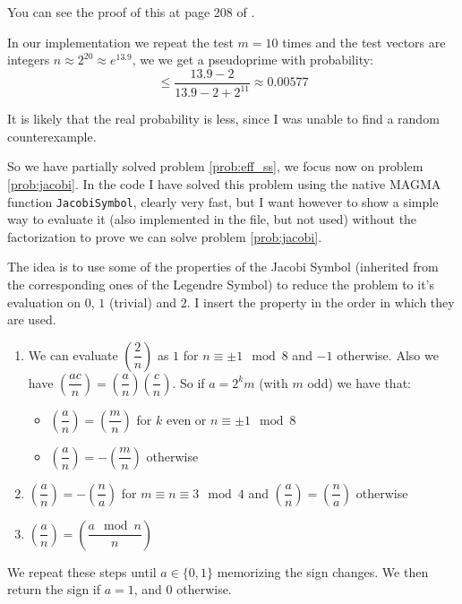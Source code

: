 \documentclass{article}
\theoremstyle{plain}
\theoremstyle{remark}
\theoremstyle{definition}
\begin{document}
You can see the proof of this at page 208 of \cite[Section 6.4.2]{stinson}.

In our implementation we repeat the test $m=10$ times and the test vectors are integers $n \approx 2^20 \approx e^{13.9}$, we we get a pseudoprime with probability:
\begin{equation*}
	\leq \frac{13.9 - 2}{13.9 - 2 + 2^{11}} \approx 0.00577
\end{equation*}

It is likely that the real probability is less, since I was unable to find a random counterexample.

So we have partially solved problem \ref{prob:eff_ss}, we focus now on problem \ref{prob:jacobi}. In the code I have solved this problem using the native MAGMA function \texttt{JacobiSymbol}, clearly very fast, but I want however to show a simple way to evaluate it (also implemented in the file, but not used) without the factorization to prove we can solve problem \ref{prob:jacobi}.

The idea is to use some of the properties of the Jacobi Symbol (inherited from the corresponding ones of the Legendre Symbol) to reduce the problem to it's evaluation on $0$, $1$ (trivial) and $2$. I insert the property in the order in which they are used. 
\begin{enumerate}
	\item We can evaluate $ \left(\dfrac{2}{n}\right) $ as $1$ for $n\equiv \pm 1 \mod 8$ and $-1$ otherwise. Also we have $ \left(\dfrac{ac}{n}\right) = \left(\dfrac{a}{n}\right)  \left(\dfrac{c}{n}\right) $. So if $a = 2^km$ (with $m$ odd) we have that:
	\begin{itemize}
		\item $\left(\dfrac{a}{n}\right) = \left(\dfrac{m}{n}\right)$ for $k$ even or $n\equiv \pm 1 \mod 8$ 
		\item $\left(\dfrac{a}{n}\right) = -\left(\dfrac{m}{n}\right)$ otherwise
	\end{itemize}
	\item $\left(\dfrac{a}{n}\right) = - \left(\dfrac{n}{a}\right)$ for $m \equiv n \equiv 3 \mod 4$ and $\left(\dfrac{a}{n}\right) = \left(\dfrac{n}{a}\right)$ otherwise
	\item $\left(\dfrac{a}{n}\right) = \left(\dfrac{a \mod n}{n}\right)$
\end{enumerate}

We repeat these steps until $a\in\{0,1\}$ memorizing the sign changes. We then return the sign if $a=1$, and $0$ otherwise.
\end{document}
